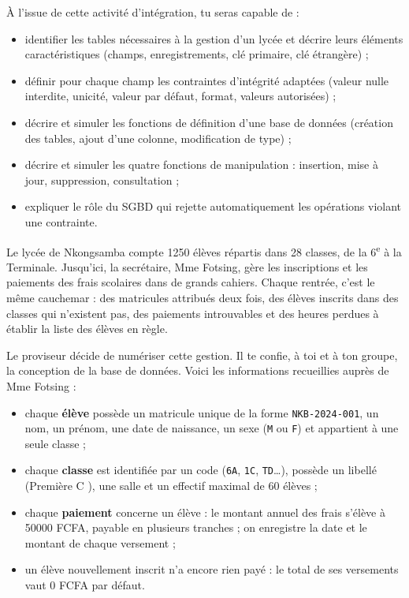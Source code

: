 \documentclass[11pt]{article}
\newcommand{\cle}[1]{{\popxbold\color{popdark}#1}}
\newcounter{popsec}
\newcounter{popsub}
\newcommand{\courssub}[1]{%
  \stepcounter{popsub}%
  \par\vspace{9pt}\noindent{\popxbold\fontsize{11.5}{13}\selectfont\color{popink}{\color{poporange}\thepopsec.\thepopsub}\hspace{6pt}#1}\par\nopagebreak\vspace{4pt}
}
\begin{document}
À l'issue de cette activité d'intégration, tu seras capable de :

\begin{itemize}
\item identifier les \cle{tables} nécessaires à la gestion d'un lycée et décrire leurs éléments caractéristiques (\cle{champs}, \cle{enregistrements}, \cle{clé primaire}, \cle{clé étrangère}) ;
\item définir pour chaque champ les \cle{contraintes d'intégrité} adaptées (valeur nulle interdite, unicité, valeur par défaut, format, valeurs autorisées) ;
\item décrire et simuler les \cle{fonctions de définition} d'une base de données (création des tables, ajout d'une colonne, modification de type) ;
\item décrire et simuler les quatre \cle{fonctions de manipulation} : insertion, mise à jour, suppression, consultation ;
\item expliquer le rôle du \cle{SGBD} qui rejette automatiquement les opérations violant une contrainte.
\end{itemize}

\courssub{Situation}

Le lycée de Nkongsamba compte \num{1250} élèves répartis dans \num{28} classes, de la 6\textsuperscript{e} à la Terminale. Jusqu'ici, la secrétaire, Mme Fotsing, gère les inscriptions et les paiements des frais scolaires dans de grands cahiers. Chaque rentrée, c'est le même cauchemar : des matricules attribués deux fois, des élèves inscrits dans des classes qui n'existent pas, des paiements introuvables et des heures perdues à établir la liste des élèves en règle.

Le proviseur décide de numériser cette gestion. Il te confie, à toi et à ton groupe, la conception de la base de données. Voici les informations recueillies auprès de Mme Fotsing :

\begin{itemize}
\item chaque \textbf{élève} possède un matricule unique de la forme \texttt{NKB-2024-001}, un nom, un prénom, une date de naissance, un sexe (\texttt{M} ou \texttt{F}) et appartient à une seule classe ;
\item chaque \textbf{classe} est identifiée par un code (\texttt{6A}, \texttt{1C}, \texttt{TD}\ldots), possède un libellé (\og Première C \fg), une salle et un effectif maximal de \num{60} élèves ;
\item chaque \textbf{paiement} concerne un élève : le montant annuel des frais s'élève à \num{50000} FCFA, payable en plusieurs tranches ; on enregistre la date et le montant de chaque versement ;
\item un élève nouvellement inscrit n'a encore rien payé : le total de ses versements vaut \num{0} FCFA par défaut.
\end{itemize}
\end{document}
